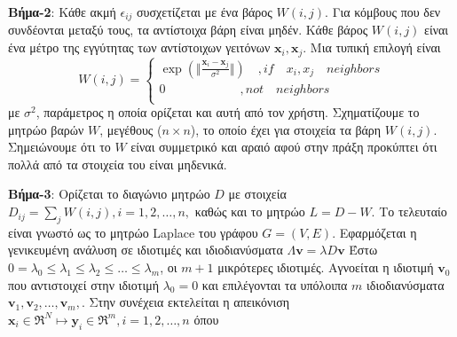 \par
\textbf{Βήμα-2}: Κάθε ακμή $\epsilon_{ij}$ συσχετίζεται με ένα βάρος $W(i,j)$. Για κόμβους που δεν συνδέονται μεταξύ τους, τα αντίστοιχα βάρη είναι μηδέν. Κάθε βάρος $W(i,j)$ είναι ένα μέτρο της εγγύτητας των αντίστοιχων γειτόνων $\mathbf{x}_{i},\mathbf{x}_{j}$. Μια τυπική επιλογή είναι \\
\newline\hspace*{\fill}
\[W(i,j) = \begin{cases} \exp(\Vert \frac{\mathbf{x}_{i}-\mathbf{x}_{j}}{\sigma^{2}} \Vert) \quad ,if \quad x_{i},x_{j} \quad neighbors\\
               0  \quad \quad \quad \quad \quad \quad ,not \quad neighbors\\
            \end{cases} \]
\hspace*{\fill}\newline 
με $\sigma^{2}$, παράμετρος η οποία ορίζεται και αυτή από τον χρήστη. Σχηματίζουμε το μητρώο βαρών $W$, μεγέθους ($n \times n$), το οποίο έχει για στοιχεία τα βάρη $W(i,j)$. Σημειώνουμε ότι το $W$ είναι συμμετρικό και αραιό αφού στην πράξη προκύπτει ότι πολλά από τα στοιχεία του είναι μηδενικά.
\par
\textbf{Βήμα-3}: Ορίζεται το διαγώνιο μητρώο $D$ με στοιχεία $D_{ij}=\sum_{j} W(i,j),i=1,2,\ldots,n,$ καθώς και το μητρώο $L=D-W$. Το τελευταίο είναι γνωστό ως το μητρώο \textlatin{Laplace} του γράφου $G=(V,E)$. Εφαρμόζεται η γενικευμένη ανάλυση σε ιδιοτιμές και ιδιοδιανύσματα 
\newline\hspace*{\fill}
$ \Lambda \mathbf{v} =  \lambda D \mathbf{v} $
\hspace*{\fill}\newline 
Έστω $ 0 = \lambda_{0} \leq \lambda_{1} \leq \lambda_{2} \leq \ldots \leq \lambda_{m}$, οι $m+1$ μικρότερες ιδιοτιμές. Αγνοείται η ιδιοτιμή $\mathbf{v}_{0}$ που αντιστοιχεί στην ιδιοτιμή $\lambda_{0} = 0$ και επιλέγονται τα υπόλοιπα $m$ ιδιοδιανύσματα $\mathbf{v}_{1},\mathbf{v}_{2},\ldots,\mathbf{v}_{m},$. Στην συνέχεια εκτελείται η απεικόνιση
\newline\hspace*{\fill}
$\mathbf{x}_{i} \in \Re^{N} \mapsto \mathbf{y}_{i} \in \Re^{m}, i=1,2,\ldots,n$
\hspace*{\fill}\newline 
όπου 
\newline\hspace*{\fill}
